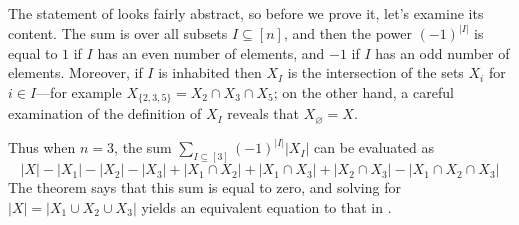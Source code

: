 The statement of  looks fairly abstract, so before we prove it, let's examine its content. The sum is over all subsets $I \subseteq [n]$, and then the power $(-1)^{|I|}$ is equal to $1$ if $I$ has an even number of elements, and $-1$ if $I$ has an odd number of elements. Moreover, if $I$ is inhabited then $X_I$ is the intersection of the sets $X_i$ for $i \in I$---for example $X_{\{2,3,5\}} = X_2 \cap X_3 \cap X_5$; on the other hand, a careful examination of the definition of $X_I$ reveals that $X_{\varnothing} = X$.

Thus when $n=3$, the sum $\sum_{I \subseteq [3]} (-1)^{|I|} |X_I|$ can be evaluated as
\[ |X| - |X_1| - |X_2| - |X_3| + |X_1 \cap X_2| + |X_1 \cap X_3| + |X_2 \cap X_3| - |X_1 \cap X_2 \cap X_3| \]
The theorem says that this sum is equal to zero, and solving for $|X| = |X_1 \cup X_2 \cup X_3|$ yields an equivalent equation to that in .

